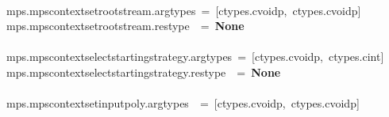 \documentclass{article}\usepackage[]{graphicx}\usepackage[dvipsnames,table]{xcolor}
\makeatletter
\newcommand{\hlopt}[1]{\textcolor[rgb]{0,0,0}{#1}}%
\newcommand{\hldef}[1]{\textcolor[rgb]{0.345,0.345,0.345}{#1}}%
\newcommand{\hlkwa}[1]{\textcolor[rgb]{0.161,0.373,0.58}{\textbf{#1}}}%
\newenvironment{kframe}{%
 \def\at@end@of@kframe{}%
 \ifinner\ifhmode%
  \def\at@end@of@kframe{\end{minipage}}%
  \begin{minipage}{\columnwidth}%
 \fi\fi%
 \def\FrameCommand##1{\hskip\@totalleftmargin \hskip-\fboxsep
 \colorbox{shadecolor}{##1}\hskip-\fboxsep
     \hskip-\linewidth \hskip-\@totalleftmargin \hskip\columnwidth}%
 \MakeFramed {\advance\hsize-\width
   \@totalleftmargin\z@ \linewidth\hsize
   \@setminipage}}%
 {\par\unskip\endMakeFramed%
 \at@end@of@kframe}
\newenvironment{knitrout}{}{} %
\makeatother
\begin{document}
\begin{center}
\begin{minipage}[m]{15cm}
\begin{knitrout}
\begin{kframe}
\hldef{}\hspace*{\fill}\\
\hldef{\textunderscore mps}\hlopt{.}\hldef{mps\textunderscore context\textunderscore set\textunderscore root\textunderscore stream}\hlopt{.}\hldef{argtypes\ }\hlopt{=\ {[}}\hldef{ctypes}\hlopt{.}\hldef{c\textunderscore void\textunderscore p}\hlopt{,\ }\hldef{ctypes}\hlopt{.}\hldef{c\textunderscore void\textunderscore p}\hlopt{{]}}\hspace*{\fill}\\
\hldef{\textunderscore mps}\hlopt{.}\hldef{mps\textunderscore context\textunderscore set\textunderscore root\textunderscore stream}\hlopt{.}\hldef{restype}\hldef{\ \ }\hldef{}\hlopt{=\ }\hldef{}\hlkwa{None}\hspace*{\fill}\\
\hldef{}\hspace*{\fill}\\
\hldef{\textunderscore mps}\hlopt{.}\hldef{mps\textunderscore context\textunderscore select\textunderscore starting\textunderscore strategy}\hlopt{.}\hldef{argtypes\ }\hlopt{=\ {[}}\hldef{ctypes}\hlopt{.}\hldef{c\textunderscore void\textunderscore p}\hlopt{,\ }\hldef{ctypes}\hlopt{.}\hldef{c\textunderscore int}\hlopt{{]}}\hspace*{\fill}\\
\hldef{\textunderscore mps}\hlopt{.}\hldef{mps\textunderscore context\textunderscore select\textunderscore starting\textunderscore strategy}\hlopt{.}\hldef{restype}\hldef{\ \ }\hldef{}\hlopt{=\ }\hldef{}\hlkwa{None}\hspace*{\fill}\\
\hldef{}\hspace*{\fill}\\
\hldef{\textunderscore mps}\hlopt{.}\hldef{mps\textunderscore context\textunderscore set\textunderscore input\textunderscore poly}\hlopt{.}\hldef{argtypes}\hldef{\ \ }\hldef{}\hlopt{=\ {[}}\hldef{ctypes}\hlopt{.}\hldef{c\textunderscore void\textunderscore p}\hlopt{,\ }\hldef{ctypes}\hlopt{.}\hldef{c\textunderscore void\textunderscore p}\hlopt{{]}}\hldef{}\hspace*{\fill}
\mbox{}
\normalfont
\end{kframe}
\end{knitrout}
\end{minipage}
\end{center}

\newpage
\end{document}
